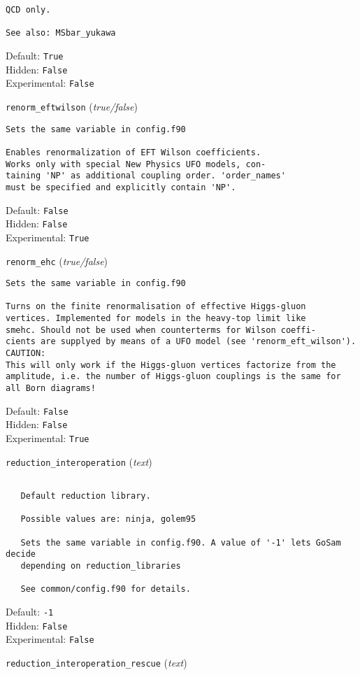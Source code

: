 \begin{basedescript}{\desclabelstyle{\pushlabel}}
\begin{verbatim}
QCD only.

See also: MSbar_yukawa
\end{verbatim}
Default: \verb|True|
\\Hidden: \verb|False|
\\Experimental: \verb|False|
\\\item[\colorbox{gray!30}{\texttt{renorm\_eftwilson}}] (\textit{true/false})
\begin{verbatim}
Sets the same variable in config.f90

Enables renormalization of EFT Wilson coefficients.
Works only with special New Physics UFO models, con-
taining 'NP' as additional coupling order. 'order_names'
must be specified and explicitly contain 'NP'.
\end{verbatim}
Default: \verb|False|
\\Hidden: \verb|False|
\\Experimental: \verb|True|
\\\item[\colorbox{gray!30}{\texttt{renorm\_ehc}}] (\textit{true/false})
\begin{verbatim}
Sets the same variable in config.f90

Turns on the finite renormalisation of effective Higgs-gluon
vertices. Implemented for models in the heavy-top limit like
smehc. Should not be used when counterterms for Wilson coeffi-
cients are supplyed by means of a UFO model (see 'renorm_eft_wilson').
CAUTION:
This will only work if the Higgs-gluon vertices factorize from the
amplitude, i.e. the number of Higgs-gluon couplings is the same for
all Born diagrams!
\end{verbatim}
Default: \verb|False|
\\Hidden: \verb|False|
\\Experimental: \verb|True|
\\\item[\colorbox{gray!30}{\texttt{reduction\_interoperation}}] (\textit{text})
\begin{verbatim}

   Default reduction library.

   Possible values are: ninja, golem95

   Sets the same variable in config.f90. A value of '-1' lets GoSam decide
   depending on reduction_libraries

   See common/config.f90 for details.
\end{verbatim}
Default: \verb|-1|
\\Hidden: \verb|False|
\\Experimental: \verb|False|
\\\item[\colorbox{gray!30}{\texttt{reduction\_interoperation\_rescue}}] (\textit{text})
\begin{verbatim}


\end{verbatim}
\end{basedescript}

